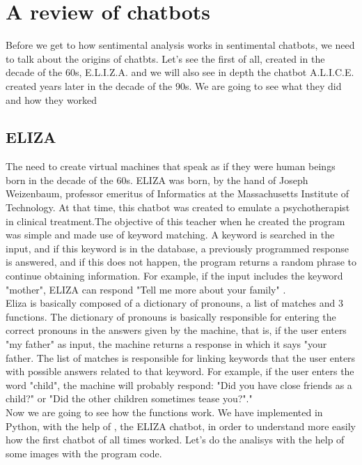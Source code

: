 \documentclass[12pt,twoside]{article}
\theoremstyle{plain}
\theoremstyle{definition}
\theoremstyle{remark}
\begin{document}
\section{A review of chatbots}
\label{sec:basics}
Before we get to how sentimental analysis works in sentimental chatbots, we need to talk about the origins of chatbts. Let's see the first of all, created in the decade of the 60s, E.L.I.Z.A. and we will also see in depth the chatbot A.L.I.C.E. created years later in the decade of the 90s. We are going to see what they did and how they worked

\subsection{ELIZA}
	\label{sec:eliza}
The need to create virtual machines that speak as if they were human beings born in the decade of the 60s. ELIZA was born, by the hand of Joseph Weizenbaum, professor emeritus of Informatics at the Massachusetts Institute of Technology. At that time, this chatbot was created to emulate a psychotherapist in clinical treatment.The objective of this teacher when he created the program was simple and made use of keyword matching. A keyword is searched in the input, and if this keyword is in the database, a previously programmed response is answered, and if this does not happen, the program returns a random phrase to continue obtaining information. For example, if the input includes the keyword "mother", ELIZA can respond "Tell me more about your family" \cite{shawar2007chatbots}.\\

Eliza is basically composed of a dictionary of pronouns, a list of matches and 3 functions.\cite{joseph1966eliza} The dictionary of pronouns is basically responsible for entering the correct pronouns in the answers given by the machine, that is, if the user enters "my father" as input, the machine returns a response in which it says "your father. The list of matches is responsible for linking keywords that the user enters with possible answers related to that keyword. For example, if the user enters the word "child", the machine will probably respond: "Did you have close friends as a child?" or "Did the other children sometimes tease you?"."\cite{joseph1966eliza}\\

Now we are going to see how the functions work. We have implemented in Python, with the help of \cite{small2017}, the ELIZA chatbot, in order to understand more easily how the first chatbot of all times worked. Let's do the analisys with the help of some images with the program code.\\
\end{document}
